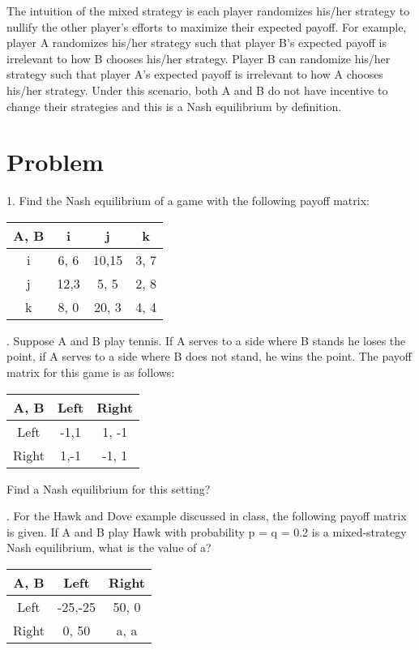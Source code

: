 \documentclass[11pt]{article}
\begin{document}
The intuition of the mixed strategy is each player randomizes his/her strategy to nullify the other player's efforts to maximize their expected payoff.
For example, player A randomizes his/her strategy such that player B's expected payoff is irrelevant to how B chooses his/her strategy.
Player B can randomize his/her strategy such that player A's expected payoff is irrelevant to how A chooses his/her strategy.
Under this scenario, both A and B do not have incentive to change their strategies and this is a Nash equilibrium by definition.

\section{Problem}
1. Find the Nash equilibrium of a game with the following payoff matrix:
\begin{center}
  \begin{tabular}{|c|c|c|c|}
    \hline
    A, B  &  i    & j    & k     \\ \hline
    i     &  6, 6 & 10,15& 3, 7  \\ \hline
    j     &  12,3 & 5,  5& 2, 8  \\ \hline
    k     &  8, 0 & 20, 3& 4, 4  \\ \hline
  \end{tabular}
\end{center}

. Suppose A and B play tennis. 
If A serves to a side where B stands he loses the point, 
if A serves to a side where B does not stand, he wins the point.
The payoff matrix for this game is as follows:
\begin{center}
  \begin{tabular}{|c|c|c|}
    \hline
    A, B  &  Left & Right \\ \hline
    Left  &  -1,1 & 1, -1 \\ \hline
    Right &  1,-1 & -1, 1 \\ \hline
  \end{tabular}
\end{center}
\noindent Find a Nash equilibrium for this setting?

. For the Hawk and Dove example discussed in class, the following payoff matrix is given. 
If A and B play Hawk with probability p = q = 0.2 is a mixed-strategy Nash equilibrium, what is the value of a?
\begin{center}
  \begin{tabular}{|c|c|c|}
    \hline
    A, B  &  Left    & Right \\ \hline
    Left  &  -25,-25 & 50, 0 \\ \hline
    Right &  0,  50  & a, a \\ \hline
  \end{tabular}
\end{center}
\end{document}
